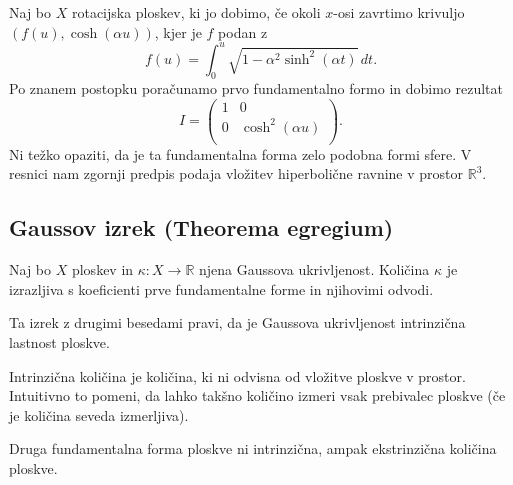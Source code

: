 \begin{primer}
Naj bo $X$ rotacijska ploskev, ki jo dobimo, če okoli $x$-osi zavrtimo krivuljo $(f(u), \cosh (\alpha u))$, kjer je $f$ podan z \begin{equation*}
f(u) = \int_{0}^{u} \sqrt{1 - \alpha^2 \sinh^2(\alpha t)}  \, dt. 
\end{equation*}  
Po znanem postopku poračunamo prvo fundamentalno formo in dobimo rezultat \begin{equation*}
    I = \begin{pmatrix}
        1 & 0\\
        0 & \cosh^2 (\alpha u)\\
    \end{pmatrix}.
\end{equation*}
Ni težko opaziti, da je ta fundamentalna forma zelo podobna formi sfere. V resnici nam zgornji predpis podaja vložitev hiperbolične ravnine v prostor $\mathbb{R}^3$. 
\end{primer}

\subsection{Gaussov izrek (Theorema egregium)}

\begin{izrek}
\label{izr_theorema_egregium}
Naj bo $X$ ploskev in $\kappa: X \to  \mathbb{R}$ njena Gaussova ukrivljenost. Količina $\kappa$ je izrazljiva s koeficienti
prve fundamentalne forme in njihovimi odvodi.
\end{izrek}

\begin{opomba}
Ta izrek z drugimi besedami pravi, da je Gaussova ukrivljenost intrinzična lastnost ploskve. 
\end{opomba}

\begin{definicija}
\label{def_intrinzicna_kolicina}
Intrinzična količina je količina, ki ni odvisna od vložitve ploskve v prostor. Intuitivno to pomeni, da lahko takšno količino izmeri vsak prebivalec ploskve (če je količina seveda izmerljiva).
\end{definicija}

\begin{opomba}
Druga fundamentalna forma ploskve ni intrinzična, ampak ekstrinzična količina ploskve.
\end{opomba}


